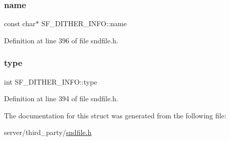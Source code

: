 \mbox{\label{struct_s_f___d_i_t_h_e_r___i_n_f_o_ad43ee482e09cdac24a3a79f186d8f715}} 
\subsubsection{\texorpdfstring{name}{name}}
{\footnotesize\ttfamily const char$\ast$ S\+F\+\_\+\+D\+I\+T\+H\+E\+R\+\_\+\+I\+N\+F\+O\+::name}



Definition at line 396 of file sndfile.\+h.

\mbox{\label{struct_s_f___d_i_t_h_e_r___i_n_f_o_aa2c525816e397993af8b95c0d4c7c69d}} 
\subsubsection{\texorpdfstring{type}{type}}
{\footnotesize\ttfamily int S\+F\+\_\+\+D\+I\+T\+H\+E\+R\+\_\+\+I\+N\+F\+O\+::type}



Definition at line 394 of file sndfile.\+h.



The documentation for this struct was generated from the following file\+:\begin{DoxyCompactItemize}
\item 
server/third\+\_\+party/\mbox{\hyperlink{sndfile_8h}{sndfile.\+h}}\end{DoxyCompactItemize}
